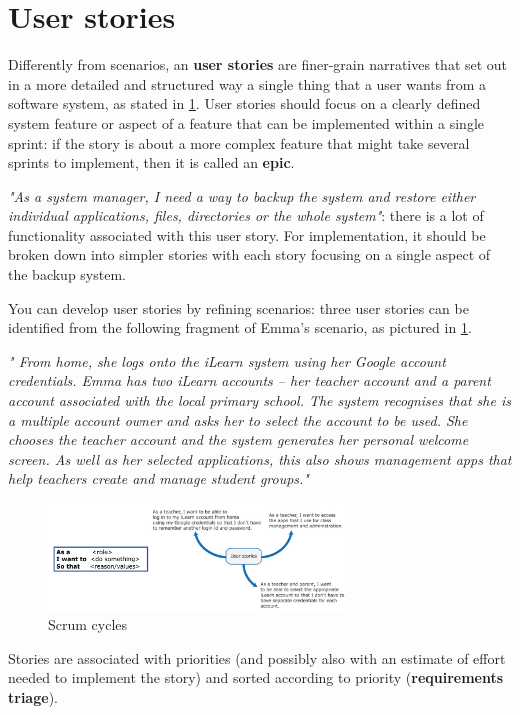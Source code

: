 \documentclass[10pt,a4paper]{report}
\begin{document}
 \section{User stories}
 Differently from scenarios, an \textbf{user stories} are finer-grain narratives that set out in a more detailed and structured way a single thing that a user wants from a software system, as stated in \ref{image20}.
 User stories should focus on a clearly defined system feature or aspect of a feature that can be implemented within a single sprint: if the story is about a more complex feature that might take several sprints to implement, then it is called an \textbf{epic}.
 
 \textit{"As a system manager, I need a way to backup the system and restore either individual applications, files, directories or the whole system"}: there is a lot of functionality associated with this user story. For implementation, it should be broken down into simpler stories with each story focusing on a single aspect of the backup system.
 
 You can develop user stories by refining scenarios: three user stories can be identified from the following fragment of Emma’s scenario, as pictured in \ref{image20}.
 
 \textit{"
 From home, she logs onto the iLearn system using her Google account
 credentials. Emma has two iLearn accounts – her teacher account and a parent
 account associated with the local primary school. The system recognises that
 she is a multiple account owner and asks her to select the account to be used.
 She chooses the teacher account and the system generates her personal
 welcome screen. As well as her selected applications, this also shows
 management apps that help teachers create and manage student groups."}
\begin{figure}[h]
	\centering
	\includegraphics[width=0.7\textwidth]{image20}
	\caption{Scrum cycles}
	\label{image20}
\end{figure}


Stories are associated with priorities (and possibly
also with an estimate of effort needed to implement
the story) and sorted according to priority
(\textbf{requirements triage}).
\end{document}
